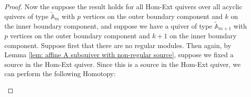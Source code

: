 \documentclass[12pt]{amsart}
\theoremstyle{plain}
\theoremstyle{definition}
\theoremstyle{remark}
\begin{document}
\begin{proof}
{\color{black} Now the suppose the result holds for all Hom-Ext quivers over all acyclic quivers of type $\tilde{\mathbb{A}}_m$ with $p$ vertices on the outer boundary component and $k$ on the inner boundary component, and suppose we have a quiver of type $\tilde{\mathbb{A}}_{m+1}$ with $p$ vertices on the outer boundary component and $k+1$ on the inner boundary component. Suppose first that there are no regular modules. Then again, by Lemma \ref{lem: affine A subquiver with non-regular source}, suppose we fixed a source in the Hom-Ext quiver. Since this is a source in the Hom-Ext quiver, we can perform the following Homotopy:}

\begin{center}
    


\begin{tikzpicture}[x=0.75pt,y=0.75pt,yscale=-1,xscale=1]


\end{tikzpicture}
\end{center}
\end{proof}
\end{document}
